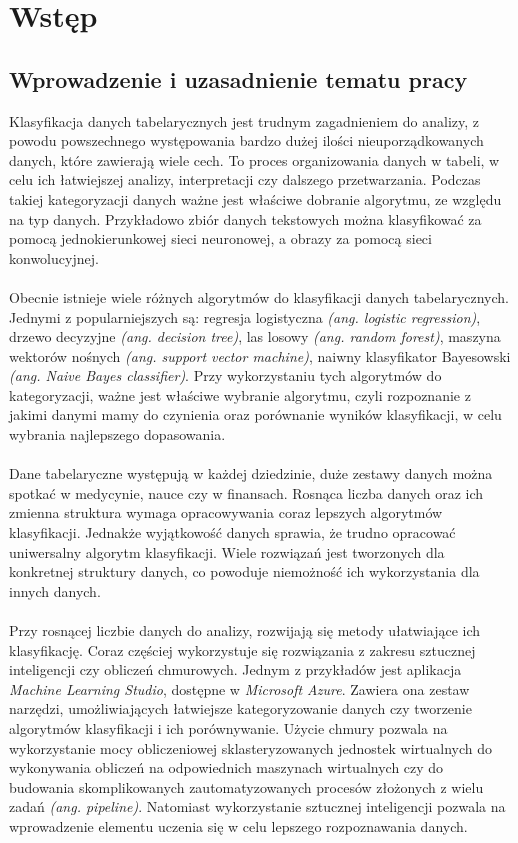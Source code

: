 \chapter{Wstęp}

\section{Wprowadzenie i uzasadnienie tematu pracy}
Klasyfikacja danych tabelarycznych jest trudnym zagadnieniem do analizy, z powodu powszechnego występowania bardzo dużej ilości nieuporządkowanych danych, które zawierają wiele cech. To proces organizowania danych w tabeli, w celu ich łatwiejszej analizy, interpretacji czy dalszego przetwarzania. Podczas takiej kategoryzacji danych ważne jest właściwe dobranie algorytmu, ze względu na typ danych. Przykładowo zbiór danych tekstowych można klasyfikować za pomocą jednokierunkowej sieci neuronowej, a obrazy za pomocą sieci konwolucyjnej.
\\ \\
Obecnie istnieje wiele różnych algorytmów do klasyfikacji danych tabelarycznych. Jednymi z popularniejszych są: regresja logistyczna \textit{(ang. logistic regression)}, drzewo decyzyjne \textit{(ang. decision tree)}, las losowy \textit{(ang. random forest)}, maszyna wektorów nośnych \textit{(ang. support vector machine)}, naiwny klasyfikator Bayesowski \textit{(ang. Naive Bayes classifier)}. Przy wykorzystaniu tych algorytmów do kategoryzacji, ważne jest właściwe wybranie algorytmu, czyli rozpoznanie z jakimi danymi mamy do czynienia oraz porównanie wyników klasyfikacji, w celu wybrania najlepszego dopasowania.
\\ \\
Dane tabelaryczne występują w każdej dziedzinie, duże zestawy danych można spotkać w medycynie, nauce czy w finansach. Rosnąca liczba danych oraz ich zmienna struktura wymaga opracowywania coraz lepszych algorytmów klasyfikacji. Jednakże wyjątkowość danych sprawia, że trudno opracować uniwersalny algorytm klasyfikacji. Wiele rozwiązań jest tworzonych dla konkretnej struktury danych, co powoduje niemożność ich wykorzystania dla innych danych.
\\ \\
Przy rosnącej liczbie danych do analizy, rozwijają się metody ułatwiające ich klasyfikację. Coraz częściej wykorzystuje się rozwiązania z zakresu sztucznej inteligencji czy obliczeń chmurowych. Jednym z przykładów jest aplikacja \textit{Machine Learning Studio},  dostępne w \textit{Microsoft Azure}. Zawiera ona zestaw narzędzi, umożliwiających łatwiejsze kategoryzowanie danych czy tworzenie algorytmów klasyfikacji i ich porównywanie. Użycie chmury pozwala na wykorzystanie mocy obliczeniowej sklasteryzowanych jednostek wirtualnych do wykonywania obliczeń na odpowiednich maszynach wirtualnych czy do budowania skomplikowanych zautomatyzowanych procesów złożonych z wielu zadań \textit{(ang. pipeline)}. Natomiast wykorzystanie sztucznej inteligencji pozwala na wprowadzenie elementu uczenia się w celu lepszego rozpoznawania danych.

